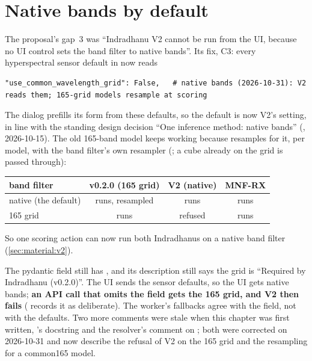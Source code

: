 \section{Native bands by default}\label{sec:submission:native}

The proposal's gap~3 was ``Indradhanu V2 cannot be run from the UI, because no UI control sets the band filter to native
bands''. Its fix, C3: every hyperspectral sensor default in  now reads
\begin{lstlisting}
"use_common_wavelength_grid": False,   # native bands (2026-10-31): V2 reads them; 165-grid models resample at scoring
\end{lstlisting}
The dialog prefills its form from these defaults, so the default is now V2's setting, in line with the standing design
decision ``One inference method: native bands'' (, 2026-10-15). The old 165-band model
keeps working because  resamples for it, per model, with the band filter's own resampler
(; a cube already on the grid is passed through):

\begin{center}\small
\begin{tabular}{@{}lccc@{}}
\toprule
band filter & v0.2.0 (165 grid) & V2 (native) & MNF-RX\\
\midrule
native (the default) & runs, resampled & runs & runs\\
165 grid & runs & refused & runs\\
\bottomrule
\end{tabular}
\end{center}

So one scoring action can now run both Indradhanus on a native band filter (\cref{sec:material:v2}).

\begin{sourcenote}
The pydantic field  still has , and its
description still says the grid is ``Required by Indradhanu (v0.2.0)''. The UI sends the sensor defaults, so the UI gets
native bands; \textbf{an API call that omits the field gets the 165 grid, and V2 then fails}
( records it as deliberate). The worker's fallbacks 
agree with the field, not with the defaults. Two more comments were stale when this chapter was first written,
's docstring and the resolver's comment on ; both were corrected on
2026-10-31 and now describe the refusal of V2 on the 165 grid and the resampling for a common165 model.
\end{sourcenote}

